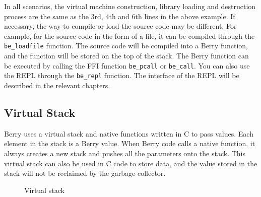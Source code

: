 In all scenarios, the virtual machine construction, library loading and destruction process are the same as the 3rd, 4th and 6th lines in the above example. If necessary, the way to compile or load the source code may be different. For example, for the source code in the form of a file, it can be compiled through the \texttt{be\_loadfile} function. The source code will be compiled into a Berry function, and the function will be stored on the top of the stack. The Berry function can be executed by calling the FFI function \texttt{be\_pcall} or \texttt{be\_call}. You can also use the REPL through the \texttt{be\_repl} function. The interface of the REPL will be described in the relevant chapters.

\subsection {Virtual Stack}

Berry uses a virtual stack and native functions written in C to pass values. Each element in the stack is a Berry value. When Berry code calls a native function, it always creates a new stack and pushes all the parameters onto the stack. This virtual stack can also be used in C code to store data, and the value stored in the stack will not be reclaimed by the garbage collector.\begin{wrapfigure}{r}{0.5\textwidth}
\centering
{}
\caption{Virtual stack}
\label{fig::virtual_stack}
\end{wrapfigure}


